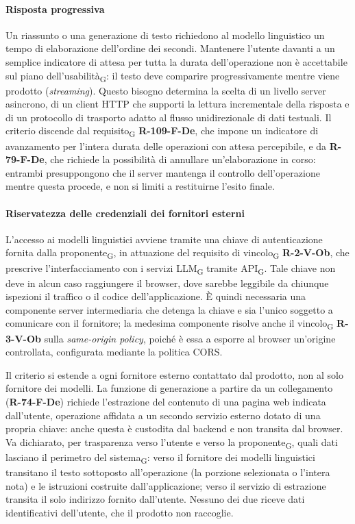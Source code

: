 \documentclass[a4paper, 10pt]{article}
\begin{document}
\paragraph{Risposta progressiva}
Un riassunto o una generazione di testo richiedono al modello linguistico un tempo di elaborazione dell'ordine dei secondi. Mantenere l'utente davanti a un semplice indicatore di attesa per tutta la durata dell'operazione non è accettabile sul piano dell'usabilità\textsubscript{G}: il testo deve comparire progressivamente mentre viene prodotto (\textit{streaming}). Questo bisogno determina la scelta di un livello server asincrono, di un client HTTP che supporti la lettura incrementale della risposta e di un protocollo di trasporto adatto al flusso unidirezionale di dati testuali. Il criterio discende dal requisito\textsubscript{G} \textbf{R-109-F-De}, che impone un indicatore di avanzamento per l'intera durata delle operazioni con attesa percepibile, e da \textbf{R-79-F-De}, che richiede la possibilità di annullare un'elaborazione in corso: entrambi presuppongono che il server mantenga il controllo dell'operazione mentre questa procede, e non si limiti a restituirne l'esito finale.

\paragraph{Riservatezza delle credenziali dei fornitori esterni}
L'accesso ai modelli linguistici avviene tramite una chiave di autenticazione fornita dalla proponente\textsubscript{G}, in attuazione del requisito di vincolo\textsubscript{G} \textbf{R-2-V-Ob}, che prescrive l'interfacciamento con i servizi LLM\textsubscript{G} tramite API\textsubscript{G}. Tale chiave non deve in alcun caso raggiungere il browser, dove sarebbe leggibile da chiunque ispezioni il traffico o il codice dell'applicazione. È quindi necessaria una componente server intermediaria che detenga la chiave e sia l'unico soggetto a comunicare con il fornitore; la medesima componente risolve anche il vincolo\textsubscript{G} \textbf{R-3-V-Ob} sulla \textit{same-origin policy}, poiché è essa a esporre al browser un'origine controllata, configurata mediante la politica CORS.

Il criterio si estende a ogni fornitore esterno contattato dal prodotto, non al solo fornitore dei modelli. La funzione di generazione a partire da un collegamento (\textbf{R-74-F-De}) richiede l'estrazione del contenuto di una pagina web indicata dall'utente, operazione affidata a un secondo servizio esterno dotato di una propria chiave: anche questa è custodita dal backend e non transita dal browser. Va dichiarato, per trasparenza verso l'utente e verso la proponente\textsubscript{G}, quali dati lasciano il perimetro del sistema\textsubscript{G}: verso il fornitore dei modelli linguistici transitano il testo sottoposto all'operazione (la porzione selezionata o l'intera nota) e le istruzioni costruite dall'applicazione; verso il servizio di estrazione transita il solo indirizzo fornito dall'utente. Nessuno dei due riceve dati identificativi dell'utente, che il prodotto non raccoglie.
\end{document}
